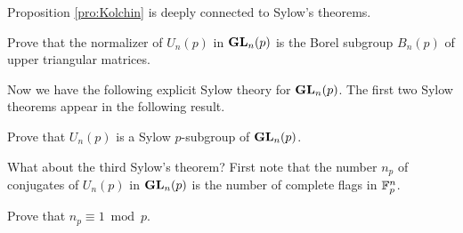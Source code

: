 Proposition \ref{pro:Kolchin} is deeply 
connected to Sylow's theorems. 

\begin{exercise}
    Prove that the normalizer of $U_n(p)$ in $\mathbf{GL}_n(p)$ is the
    Borel subgroup $B_n(p)$ of upper triangular matrices. 
\end{exercise}

Now we have the following explicit Sylow theory for
$\mathbf{GL}_n(p)$. The first two Sylow theorems 
appear in the following result. 

\begin{exercise}
    Prove that  $U_n(p)$ is a Sylow $p$-subgroup of $\mathbf{GL}_n(p)$. 
\end{exercise}

What about the third Sylow's theorem? 
First note that the number $n_p$
of conjugates of $U_n(p)$ in $\mathbf{GL}_n(p)$ 
is the number of complete flags 
in $\mathbb{F}_p^n$.

\begin{exercise}
    Prove that $n_p\equiv1\bmod p$. 
\end{exercise}

